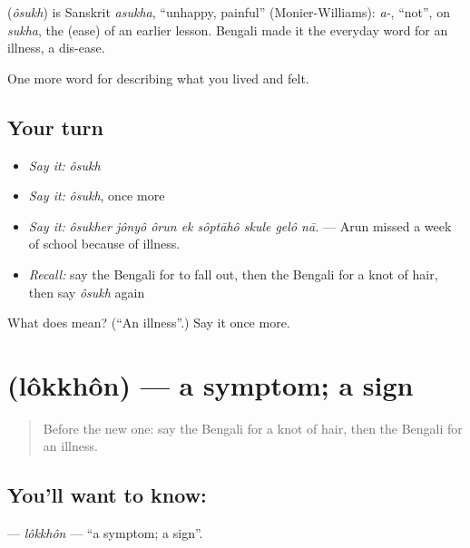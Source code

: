 \begin{cousinweb}
\textbf{} (\emph{ôsukh}) is Sanskrit \emph{asukha}, \textquotedblleft{}unhappy, painful\textquotedblright{} (Monier-Williams): \emph{a-}, \textquotedblleft{}not\textquotedblright{}, on \emph{sukha}, the  (ease) of an earlier lesson. Bengali made it the everyday word for an illness, a dis-ease.
\end{cousinweb}

\begin{grammarlens}[title={What you've built}]
One more word for describing what you lived and felt.
\end{grammarlens}

\subsection*{Your turn}
\begin{itemize}
\raggedright
  \item \emph{Say it:} \emph{ôsukh}
  \item \emph{Say it:} \emph{ôsukh}, once more
  \item \emph{Say it:} \emph{ôsukher jônyô ôrun ek sôptāhô skule gelô nā.} — Arun missed a week of school because of illness.
  \item \emph{Recall:} say the Bengali for to fall out, then the Bengali for a knot of hair, then say \emph{ôsukh} again
\end{itemize}

\begin{tcolorbox}[breakable,colback=teal!4,colframe=teal!35!black,title={Before you move on}]
What does  mean? (\textquotedblleft{}An illness\textquotedblright{}.) Say it once more.
\end{tcolorbox}
\section[\texorpdfstring{\bn{লক্ষণ} (lôkkhôn)}{লক্ষণ (lôkkhôn)}]{ (lôkkhôn) — a symptom; a sign}

\label{lesson:BN-C471-lokkhon}



\begin{quote}
Before the new one: say the Bengali for a knot of hair, then the Bengali for an illness.
\end{quote}

\subsection*{You'll want to know: }
\textbf{} — \emph{lôkkhôn} — \textquotedblleft{}a symptom; a sign\textquotedblright{}.

